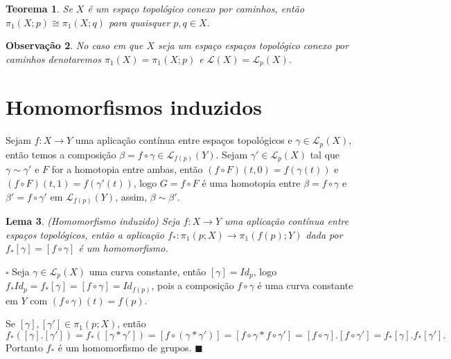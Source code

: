 \documentclass[12pt]{book}
\newtheorem{teorema}{Teorema}[section]
\newtheorem{lema}[teorema]{Lema}
\newtheorem{observacao}[teorema]{Observação}
\newenvironment{prova}[1]{$\square$ #1}{\hfill$\blacksquare$}
\newcommand{\caminhos}{\mathcal{L}}
\newcommand{\caminhossempontobase}[1]{\caminhos(#1)}
\newcommand{\caminhospontobasegeral}[2]{\caminhos_{#1}(#2)}
\newcommand{\classe}[1]{[#1]}
\newcommand{\grupofundamental}[1]{\pi_{1}(#1)}
\newcommand{\grupofundamentalpontobase}[2]{\pi_{1}(#1; #2)}
\begin{document}
	\begin{teorema}
		Se $X$ é um espaço topológico conexo por caminhos, então $\grupofundamentalpontobase{X}{p} \cong \grupofundamentalpontobase{X}{q}$ para quaisquer $p,q \in X$.
	\end{teorema}
	
	\begin{observacao}\label{observacao_grupo_funcamental_sem_ponto_base}
		No caso em que $X$ seja um espaço espaços topológico conexo por caminhos denotaremos $\grupofundamental{X}=\grupofundamentalpontobase{X}{p}$ e $\caminhossempontobase{X}=\caminhospontobasegeral{p}{X}$.
	\end{observacao}
	
	\section{Homomorfismos induzidos}
	Sejam $f:X\to Y$ uma aplicação contínua entre espaços topológicos e $\gamma \in \caminhospontobasegeral{p}{X}$, então temos a composição $\beta=f\circ \gamma \in \caminhospontobasegeral{f(p)}{Y}$. Sejam $\gamma' \in \caminhospontobasegeral{p}{X}$ tal que $\gamma \sim \gamma'$ e $F$ for a homotopia entre ambas, então $(f\circ F)(t,0) =  f(\gamma(t))$ e $(f\circ F)(t,1) =  f(\gamma'(t)) $, logo $G=f\circ F$ é uma homotopia entre $\beta=f\circ \gamma$ e $\beta' = f\circ \gamma'$ em $\caminhospontobasegeral{f(p)}{Y}$, assim, $\beta \sim \beta'$.
	
	\begin{lema}
		(Homomorfismo induzido) Seja $f:X\to Y$ uma aplicação contínua entre espaços topológicos, então a aplicação $f_{*}:\grupofundamentalpontobase{p}{X} \to \grupofundamentalpontobase{f(p)}{Y}$ dada por $f_{*}\classe{\gamma} = \classe{f\circ\gamma}$ é um homomorfismo.
	\end{lema}
	\begin{prova}
		Seja $\gamma \in \caminhospontobasegeral{p}{X}$ uma curva constante, então $\classe{\gamma} = Id_{p}$, logo $f_{*}Id_{p} = f_{*}\classe{\gamma} = \classe{f\circ\gamma} = Id_{f(p)}$, pois a composição $f\circ\gamma$ é uma curva constante em $Y$ com $(f\circ\gamma)(t) = f(p)$.
		
		Se $\classe{\gamma}, \classe{\gamma'}\in \grupofundamentalpontobase{p}{X}$, então 
		$$
		f_{*}(\classe{\gamma}.\classe{\gamma'}) = f_{*}(\classe{\gamma*\gamma'}) = \classe{f\circ(\gamma*\gamma')} = \classe{f\circ\gamma*f\circ\gamma'} =
		\classe{f\circ\gamma}.\classe{f\circ\gamma'}=	f_{*}\classe{\gamma}.f_{*}\classe{\gamma'}.
		$$
		Portanto $f_{*}$ é um homomorfismo de grupos.
	\end{prova}
	
\end{document}
